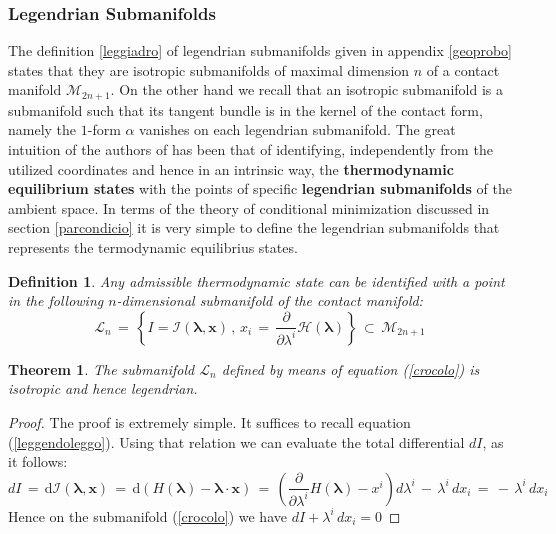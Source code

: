 \documentclass[10pt,a4paper]{article}
\newtheorem{definizione}{Definition}[section]
\newtheorem{teorema}{Theorem}[section]
\newtheorem{proof}{Proof}[section]
\begin{document}
\subsubsection{Legendrian Submanifolds}
The definition \ref{leggiadro} of legendrian submanifolds given in appendix \ref{geoprobo} states that they are
isotropic submanifolds of maximal dimension $n$ of a contact manifold $\mathcal{M}_{2n+1}$.  On the other hand we recall that
an isotropic submanifold is a submanifold such that its tangent bundle is in the kernel
of the contact form, namely the $1$-form $\alpha$ vanishes on each legendrian submanifold.  The great intuition of the authors
of \cite{ludaed,ludaed2} has been that of identifying, independently from the utilized coordinates and hence in an intrinsic way,
 the \textbf{thermodynamic equilibrium states} with the points
of  specific \textbf{legendrian submanifolds} of the ambient space.
 In terms of the theory  of conditional minimization
discussed in section \ref{parcondicio} it is very simple
to define  the legendrian submanifolds that represents the termodynamic equilibrius states.
\begin{definizione}
\label{defingolegend} Any admissible thermodynamic state can be  identified with a point
in the following  $n$-dimensional submanifold  of the contact manifold:
\begin{equation}
\label{crocolo}
    \mathcal{L}_n \, = \, \left\{ I =
    \mathcal{I}\left(\pmb{\lambda},\mathbf{x}\right)\, , \, x_i \, = \,
    \frac{\partial}{\partial \lambda^i}
    \mathcal{H}\left(\pmb{\lambda}\right)\right\} \, \subset \,\mathcal{M}_{2n+1}
\end{equation}
\end{definizione}
\par
\begin{teorema}
\label{gargantua} The submanifold $\mathcal{L}_n$ defined by means of equation
(\ref{crocolo}) is isotropic and hence legendrian.
\end{teorema}
\begin{proof}
The proof is extremely simple. It suffices to recall equation
(\ref{leggendoleggo}). Using that relation we can evaluate the
total differential $dI$, as it follows:
\begin{equation}
dI \, = \,
\mathrm{d}\mathcal{I}\left(\pmb{\lambda},\mathbf{x}\right)\, =
\,\mathrm{d}\left(H(\pmb{\lambda})-\pmb{\lambda}\cdot\mathbf{x}\right)\,
=\, \left(\frac{\partial}{\partial
\lambda^i}H(\pmb{\lambda})-x^i\right)d\lambda^i \, - \, \lambda^i
\,dx_i \, = \, - \, \lambda^i \,dx_i
\end{equation}
Hence on the submanifold (\ref{crocolo}) we have
$dI+\lambda^i \,dx_i=0$
\end{proof}
\end{document}
